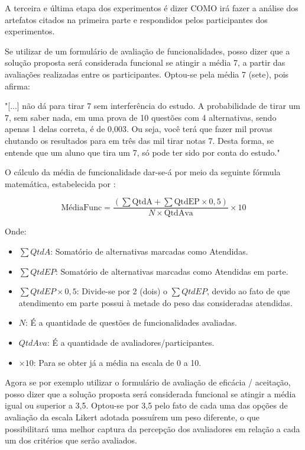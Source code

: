 A terceira e última etapa dos experimentos é dizer COMO irá fazer a análise dos artefatos citados na primeira parte e respondidos pelos participantes dos experimentos. 

Se utilizar de um formulário de avaliação de funcionalidades, posso dizer que a solução proposta será considerada funcional se atingir a média 7, a partir das avaliações realizadas entre os participantes. Optou-se pela média 7 (sete), pois \textcite{junek2014} afirma:

"[...] não dá para tirar 7 sem interferência do estudo. A probabilidade de tirar um 7, sem saber nada, em uma prova de 10 questões com 4 alternativas, sendo apenas 1 delas correta, é de 0,003. Ou seja, você terá que fazer mil provas chutando os resultados para em três das mil tirar notas 7. Desta forma, se entende que um aluno que tira um 7, só pode ter sido por conta do estudo."

O cálculo da média de funcionalidade dar-se-á por meio da seguinte fórmula matemática, estabelecida por \textcite{campagnaro2017}:

\begin{equation}
\text{MédiaFunc} = \frac{(\sum \text{QtdA} + \sum \text{QtdEP} \times 0,5)}{N \times \text{QtdAva}} \times 10
\end{equation}

Onde: 
\begin{itemize}
    \item $\sum QtdA$: Somatório de alternativas marcadas como Atendidas.
    \item $\sum QtdEP$: Somatório de alternativas marcadas como Atendidas em parte.
    \item $\sum QtdEP \times 0,5$: Divide-se por 2 (dois) o $\sum QtdEP$, devido ao fato de que atendimento em parte possui à metade do peso das consideradas atendidas.
    \item $N$: É a quantidade de questões de funcionalidades avaliadas.
    \item $QtdAva$: É a quantidade de avaliadores/participantes.
    \item $\times 10$: Para se obter já a média na escala de 0 a 10.
\end{itemize}

Agora se por exemplo utilizar o formulário de avaliação de eficácia / aceitação, posso dizer que a solução proposta será considerada funcional se atingir a média igual ou superior a 3,5. Optou-se por 3,5 pelo fato de cada uma das opções de avaliação da escala Likert adotada possuírem um peso diferente, o que possibilitará uma melhor captura da percepção dos avaliadores em relação a cada um dos critérios que serão avaliados.

